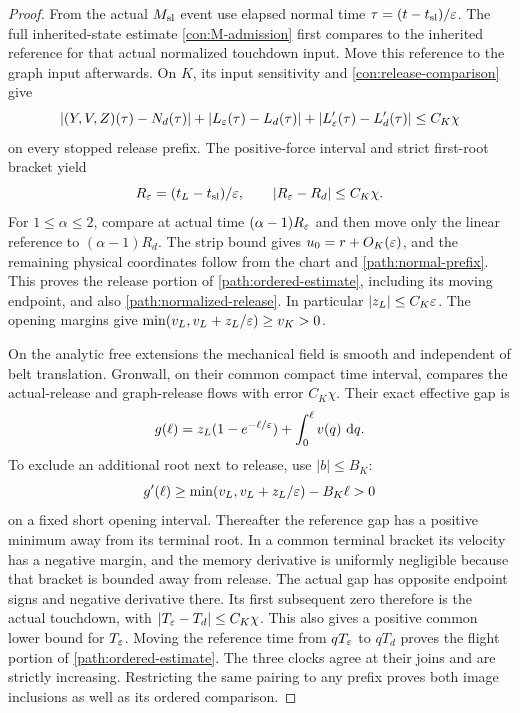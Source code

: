 \begin{proof}
From the actual $M_{\rm sl}$ event use elapsed normal time
$\tau=(t-t_{\rm sl})/\varepsilon$.  The full inherited-state estimate
\eqref{con:M-admission} first compares to the inherited reference
for that actual normalized touchdown input.  Move this reference to the graph
input afterwards.  On $K$, its input sensitivity and
\eqref{con:release-comparison} give
\begin{equation}
 |(Y,V,Z)(\tau)-N_d(\tau)|+
 |L_\varepsilon(\tau)-L_d(\tau)|+
 |L_\varepsilon'(\tau)-L_d'(\tau)|\le C_K\chi
 \label{path:normal-prefix}
\end{equation}
on every stopped release prefix.  The positive-force interval and
strict first-root bracket yield
\[
 R_\varepsilon=(t_L-t_{\rm sl})/\varepsilon,
 \qquad |R_\varepsilon-R_d|\le C_K\chi.
\]
For $1\le\alpha\le2$, compare at actual time
$(\alpha-1)R_\varepsilon$ and then move only the linear reference to
$(\alpha-1)R_d$.  The strip bound gives $u_0=r+O_K(\varepsilon)$,
and the remaining physical coordinates follow from the chart and
\eqref{path:normal-prefix}.  This proves the release portion of
\eqref{path:ordered-estimate}, including its moving endpoint,
and also \eqref{path:normalized-release}.  In particular
$|z_L|\le C_K\varepsilon$.  The opening margins give
$\min(v_L,v_L+z_L/\varepsilon)\ge v_K>0$.

On the analytic free extensions the mechanical field is smooth and
independent of belt translation.  Gronwall, on their common compact
time interval, compares the actual-release and graph-release flows
with error $C_K\chi$.  Their exact effective gap is
\begin{equation}
 g(\ell)=z_L(1-e^{-\ell/\varepsilon})+
                  \int_0^\ell v(q)\,\,\mathrm d q.
 \label{path:exact-free-gap}
\end{equation}
To exclude an additional root next to release, use $|b|\le B_K$:
\[
 g'(\ell)\ge\min(v_L,v_L+z_L/\varepsilon)-B_K\ell>0
\]
on a fixed short opening interval.  Thereafter the reference gap
has a positive minimum away from its terminal root.  In a common
terminal bracket its velocity has a negative margin, and the memory
derivative is uniformly negligible because that bracket is bounded
away from release.  The actual gap has opposite endpoint signs
and negative derivative there.  Its first subsequent zero therefore
is the actual touchdown, with
$|T_\varepsilon-T_d|\le C_K\chi$.  This also gives a positive common
lower bound for $T_\varepsilon$.  Moving the reference time from
$qT_\varepsilon$ to $qT_d$ proves the flight portion of
\eqref{path:ordered-estimate}.  The three clocks agree at their
joins and are strictly increasing.  Restricting the same pairing
to any prefix proves both image inclusions as well as its ordered
comparison.
\end{proof}

